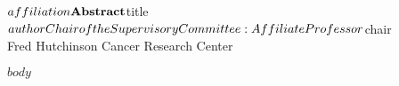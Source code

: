 \begin{center}
${affiliation} \\
\vspace{0.5cm}
\textbf{Abstract} \\
\vspace{0.5cm}
${title} \\
\vspace{0.5cm}
${author} \\
\vspace{0.5cm}
Chair of the Supervisory Committee: \\
Affiliate Professor ${chair} \\
Fred Hutchinson Cancer Research Center
\end{center}
$body$

